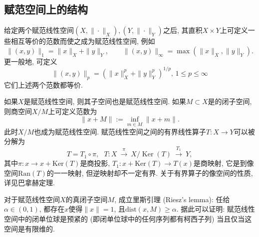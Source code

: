 \subsection{赋范空间上的结构}
给定两个赋范线性空间$(X,\|\cdot\|_X),(Y,\|\cdot\|_Y)$之后, 其直积$X\times Y$上可定义一些相互等价的范数而使之成为赋范线性空间, 例如
$$
\|(x,y)\|_{1}=\|x\|_X+\|y\|_Y,\qquad \|(x,y)\|_{\infty }=\max(\|x\|_X,\|y\|_Y).
$$
更一般地, 可定义
$$
\|(x,y)\|_{p}=\left(\|x\|_X^p+\|y\|_Y^p\right)^{1/p},\,1\leq p\leq\infty
$$
它们上述两个范数都等价.

如果$X$是赋范线性空间, 则其子空间也是赋范线性空间. 如果$M\subset X$是的闭子空间, 则商空间$X/M$上可定义范数为
$$
\|x+M\|:=\inf \limits _{m\in M}\|x+m\|.
$$
此时$X/M$也成为赋范线性空间. 赋范线性空间之间的有界线性算子$T:X\to Y$可以被分解为
$$
T=T_{1}\circ \pi ,\ \ \ T:X\ {\overset {\pi }{\longrightarrow }}\ X/\operatorname {Ker} (T)\ {\overset {T_{1}}{\longrightarrow }}\ Y,
$$
其中$\pi:x\to x+\text{Ker}(T)$是商投影, $T_1:x+\text{Ker}(T)\to T(x)$是商映射, 它是到像空间$\text{Ran}(T)$的一一映射, 但逆映射却不一定有界. 关于有界算子的像空间的性质, 详见巴拿赫定理. %

对于赋范线性空间$X$的真闭子空间$M$, 成立里斯引理 (Riesz's lemma): 任给$\alpha\in(0,1)$, 都存在$x$使得$\|x\|=1$, 且$\text{dist}(x,M)\geq\alpha$. 据此可以证明: 赋范线性空间中的闭单位球是预紧的 (即闭单位球中的任何序列都有柯西子列) 当且仅当这空间是有限维的.
